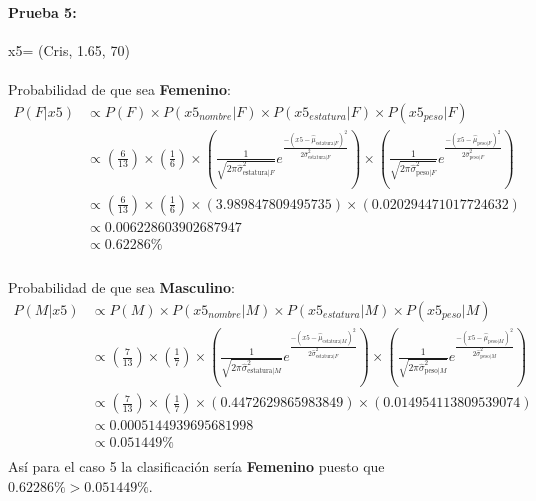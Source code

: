\documentclass[12pt]{article}
\begin{document}
 \paragraph{Prueba 5: }x5= (Cris, 1.65, 70)
 \paragraph{}Probabilidad de que sea \textbf{Femenino}:\\
 \begin{equation}
 \begin{split}
 P(F|x5) &\propto P(F) \times P(x5_{nombre}|F) \times P(x5_{estatura}|F) \times P(x5_{peso}|F) \\
 &\propto (\frac{6}{13}) \times (\frac{1}{6}) \times (\frac{1}{\sqrt{2\pi\hat{\sigma}_{\text{estatura}|F}^2}}e^{\frac{-(x5 - \hat{\mu}_{\text{estatura}|F})^2}{2\hat{\sigma}_{\text{estatura}|F}^2}}) \times (\frac{1}{\sqrt{2\pi\hat{\sigma}_{\text{peso}|F}^2}}e^{\frac{-(x5 - \hat{\mu}_{\text{peso}|F})^2}{2\hat{\sigma}_{\text{peso}|F}^2}}) \\
 &\propto (\frac{6}{13}) \times (\frac{1}{6}) \times (3.989847809495735) \times (0.020294471017724632) \\
 &\propto 0.006228603902687947 \\
 &\propto 0.62286\% \\
 \end{split}
 \end{equation}
 \paragraph{}Probabilidad de que sea \textbf{Masculino}:\\
 \begin{equation}
 \begin{split}
 P(M|x5) &\propto P(M) \times P(x5_{nombre}|M) \times P(x5_{estatura}|M) \times P(x5_{peso}|M) \\
 &\propto (\frac{7}{13}) \times (\frac{1}{7}) \times (\frac{1}{\sqrt{2\pi\hat{\sigma}_{\text{estatura}|M}^2}}e^{\frac{-(x5 - \hat{\mu}_{\text{estatura}|M})^2}{2\hat{\sigma}_{\text{estatura}|F}^2}}) \times (\frac{1}{\sqrt{2\pi\hat{\sigma}_{\text{peso}|M}^2}}e^{\frac{-(x5 - \hat{\mu}_{\text{peso}|M})^2}{2\hat{\sigma}_{\text{peso}|M}^2}}) \\
 &\propto (\frac{7}{13}) \times (\frac{1}{7}) \times (0.4472629865983849) \times (0.014954113809539074) \\
 &\propto 0.0005144939695681998 \\
 &\propto 0.051449 \% \\
 \end{split}
 \end{equation}
 Así para el caso 5 la clasificación sería \textbf{Femenino} puesto que $0.62286\% > 0.051449\%$.\\
 \clearpage
 \pagebreak
\end{document}
